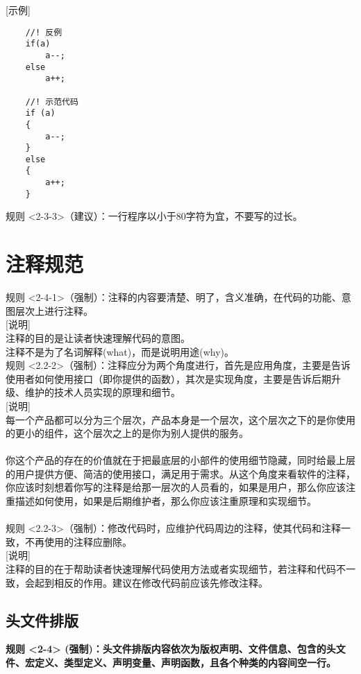 \documentclass[UTF8,a4paper,12pt]{article}
\begin{document}
	[示例]\\
	\begin{lstlisting}
	//! 反例
	if(a)
		a--;
	else
		a++;
	
	//! 示范代码
	if (a)
	{
		a--;
	}
	else
	{
		a++;
	}
	\end{lstlisting}

	规则 <2-3-3>（建议）：一行程序以小于80字符为宜，不要写的过长。
	\newpage
	\section{注释规范}
	规则 <2-4-1>（强制）：注释的内容要清楚、明了，含义准确，在代码的功能、意图层次上进行注释。\\

	[说明]\\
	注释的目的是让读者快速理解代码的意图。\\
	注释不是为了名词解释(what)，而是说明用途(why)。\\
	
	规则 <2.2-2>（强制）：注释应分为两个角度进行，首先是应用角度，主要是告诉使用者如何使用接口（即你提供的函数），其次是实现角度，主要是告诉后期升级、维护的技术人员实现的原理和细节。\\
	
	[说明]\\
	每一个产品都可以分为三个层次，产品本身是一个层次，这个层次之下的是你使用的更小的组件，这个层次之上的是你为别人提供的服务。\\
	\\
	你这个产品的存在的价值就在于把最底层的小部件的使用细节隐藏，同时给最上层的用户提供方便、简洁的使用接口，满足用于需求。从这个角度来看软件的注释，你应该时刻想着你写的注释是给那一层次的人员看的，如果是用户，那么你应该注重描述如何使用，如果是后期维护者，那么你应该注重原理和实现细节。\\
	\\
	规则 <2.2-3>（强制）：修改代码时，应维护代码周边的注释，使其代码和注释一致，不再使用的注释应删除。\\
	
	[说明]\\
	注释的目的在于帮助读者快速理解代码使用方法或者实现细节，若注释和代码不一致，会起到相反的作用。建议在修改代码前应该先修改注释。
	
	\subsection{头文件排版}
	\textbf{规则 <2-4> (强制)：头文件排版内容依次为版权声明、文件信息、包含的头文件、宏定义、类型定义、声明变量、声明函数，且各个种类的内容间空一行。}
	
\end{document}
